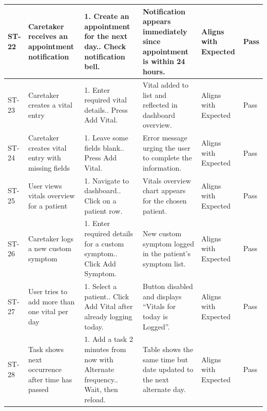 \documentclass[12pt,a4paper]{article}
\begin{document}
\begin{longtable}{|p{1cm}|p{2.5cm}|p{3.5cm}|p{3.5cm}|p{2cm}|p{1.2cm}|}
    ST-22 & Caretaker receives an appointment notification &
        1. Create an appointment for the next day.\newline
        2. Check notification bell. &
        Notification appears immediately since appointment is within 24 hours. &
        Aligns with Expected & Pass \\
    \hline
 
    ST-23 & Caretaker creates a vital entry &
        1. Enter required vital details.\newline
        2. Press Add Vital. &
        Vital added to list and reflected in dashboard overview. &
        Aligns with Expected & Pass \\
    \hline
 
    ST-24 & Caretaker creates vital entry with missing fields &
        1. Leave some fields blank.\newline
        2. Press Add Vital. &
        Error message urging the user to complete the information. &
        Aligns with Expected & Pass \\
    \hline
 
    ST-25 & User views vitals overview for a patient &
        1. Navigate to dashboard.\newline
        2. Click on a patient row. &
        Vitals overview chart appears for the chosen patient. &
        Aligns with Expected & Pass \\
    \hline
 
    ST-26 & Caretaker logs a new custom symptom &
        1. Enter required details for a custom symptom.\newline
        2. Click Add Symptom. &
        New custom symptom logged in the patient's symptom list. &
        Aligns with Expected & Pass \\
    \hline
 
    ST-27 & User tries to add more than one vital per day &
        1. Select a patient.\newline
        2. Click Add Vital after already logging today. &
        Button disabled and displays ``Vitals for today is Logged''. &
        Aligns with Expected & Pass \\
    \hline
 
    ST-28 & Task shows next occurrence after time has passed &
        1. Add a task 2 minutes from now with Alternate frequency.\newline
        2. Wait, then reload. &
        Table shows the same time but date updated to the next alternate day. &
        Aligns with Expected & Pass \\
    \hline
 

\end{longtable}
\end{document}

